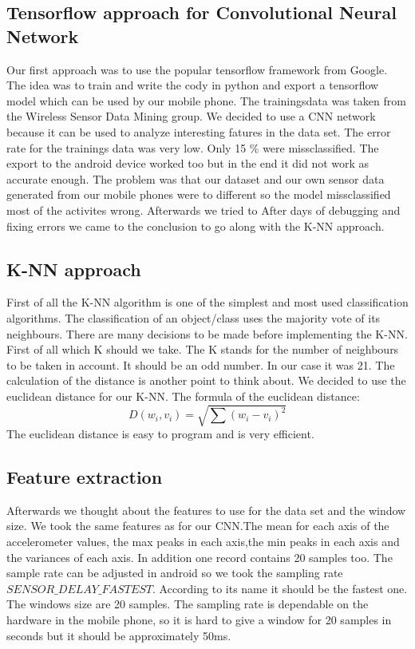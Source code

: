 \documentclass[conference]{IEEEtran}
\begin{document}
\subsection{Tensorflow approach for Convolutional Neural Network}
Our first approach was to use the popular tensorflow framework from Google. The idea was to train and write the cody in python and export a tensorflow model which can be used by our mobile phone. The trainingsdata was taken from the Wireless Sensor Data Mining group\cite{b1}. We decided to use a CNN network because it can be used to analyze interesting fatures in the data set. The error rate for the trainings data was very low. Only 15 \% were missclassified. The export to the android device worked too but in the end it did not work as accurate enough. The problem was that our dataset and our own sensor data generated from our mobile phones were to different so the model missclassified most of the activites wrong. Afterwards we tried to After days of debugging and fixing errors we came to the conclusion to go along with the K-NN approach\cite{b2}.
\subsection{K-NN approach}
First of all the K-NN algorithm is one of the simplest and most used classification algorithms. The classification of an object/class uses the majority vote of its neighbours. There are many decisions to be made before implementing the K-NN. First of all which K should we take. The K stands for the number of neighbours to be taken in account. It should be an odd number. In our case it was 21. The calculation of the distance is another point to think about. We decided to use the euclidean distance for our K-NN. The formula of the euclidean distance:
\begin{equation}
D(w_i,v_i) = \sqrt{\sum{(w_i - v_i)^2}}
\end{equation}
The euclidean distance is easy to program and is very efficient. 
\subsection{Feature extraction}
Afterwards we thought about the features to use for the data set and the window size. We took the same features as for our CNN.The mean for each axis of the accelerometer values, the max peaks in each axis,the min peaks in each axis and the variances of each axis. 
In addition one record contains 20 samples too. The sample rate can be adjusted in android so we took the sampling rate $SENSOR\_DELAY\_FASTEST$. According to its name it should be the fastest one. The windows size are 20 samples. The sampling rate is dependable on the hardware in the mobile phone, so it is hard to give a window for 20 samples in seconds but it should be approximately 50ms. 
\end{document}
